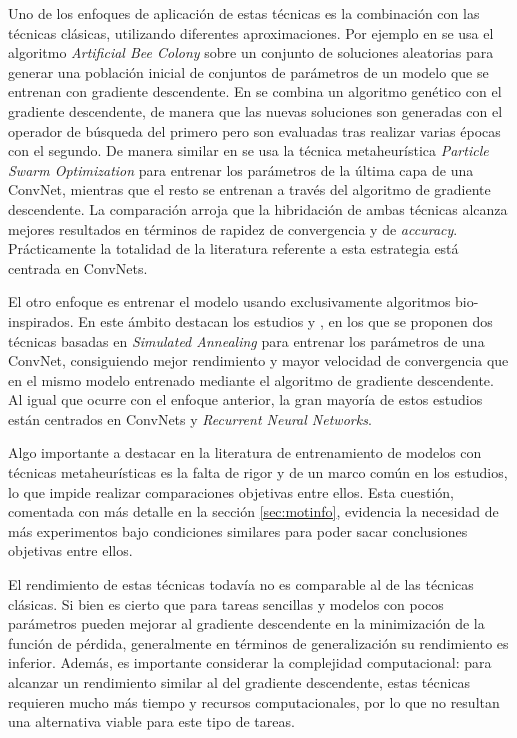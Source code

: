 Uno de los enfoques de aplicación de estas técnicas es la combinación con las técnicas clásicas, utilizando diferentes aproximaciones. Por ejemplo en \cite{162} se usa el algoritmo \textit{Artificial Bee Colony} \cite{beesalgo} sobre un conjunto de soluciones aleatorias para generar una población inicial de conjuntos de parámetros de un modelo que se entrenan con gradiente descendente. En \cite{155} se combina un algoritmo genético con el gradiente descendente, de manera que las nuevas soluciones son generadas con el operador de búsqueda del primero pero son evaluadas tras realizar varias épocas con el segundo. De manera similar en \cite{163} se usa la técnica metaheurística \textit{Particle Swarm Optimization} \cite{pso} para entrenar los parámetros de la última capa de una ConvNet, mientras que el resto se entrenan a través del algoritmo de gradiente descendente. La comparación arroja que la hibridación de ambas técnicas alcanza mejores resultados en términos de rapidez de convergencia y de \textit{accuracy}. Prácticamente la totalidad de la literatura referente a esta estrategia está centrada en ConvNets.

El otro enfoque es entrenar el modelo usando exclusivamente algoritmos bio-inspirados. En este ámbito destacan los estudios \cite{174} y \cite{176}, en los que se proponen dos técnicas basadas en \textit{Simulated Annealing} \cite{siman} para entrenar los parámetros de una ConvNet, consiguiendo mejor rendimiento y mayor velocidad de convergencia que en el mismo modelo entrenado mediante el algoritmo de gradiente descendente. Al igual que ocurre con el enfoque anterior, la gran mayoría de estos estudios están centrados en ConvNets y \textit{Recurrent Neural Networks}. 

Algo importante a destacar en la literatura de entrenamiento de modelos con técnicas metaheurísticas es la falta de rigor y de un marco común en los estudios, lo que impide realizar comparaciones objetivas entre ellos. Esta cuestión, comentada con más detalle en la sección \ref{sec:motinfo}, evidencia la necesidad de más experimentos bajo condiciones similares para poder sacar conclusiones objetivas entre ellos.

El rendimiento de estas técnicas todavía no es comparable al de las técnicas clásicas. Si bien es cierto que para tareas sencillas y modelos con pocos parámetros pueden mejorar al gradiente descendente en la minimización de la función de pérdida, generalmente en términos de generalización su rendimiento es inferior. Además, es importante considerar la complejidad computacional: para alcanzar un rendimiento similar al del gradiente descendente, estas técnicas requieren mucho más tiempo y recursos computacionales, por lo que no resultan una alternativa viable para este tipo de tareas.




